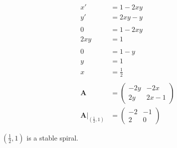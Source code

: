 \documentclass{article}
\begin{document}
\begin{align*}
  x'                                                        & = 1 - 2 x y      \\
  y'                                                        & = 2 x y - y      \\ \\
  0                                                         & = 1 - 2 x y      \\
  2 x y                                                     & = 1              \\ \\
  0                                                         & = 1 - y          \\
  y                                                         & = 1              \\
  x                                                         & = \frac{1}{2}    \\ \\
  \mathbf{A}                                                & = \begin{pmatrix}
                                                                  -2 y & -2 x    \\
                                                                  2 y  & 2 x - 1
                                                                \end{pmatrix} \\
  \left. \mathbf{A} \right|_{\left( \frac{1}{2}, 1 \right)} & = \begin{pmatrix}
                                                                  -2 & -1 \\
                                                                  2  & 0
                                                                \end{pmatrix}
\end{align*}

$\left( \frac{1}{2}, 1 \right)$ is a stable spiral.

\setcounter{subsubsection}{12}
\subsubsection{}
\end{document}
